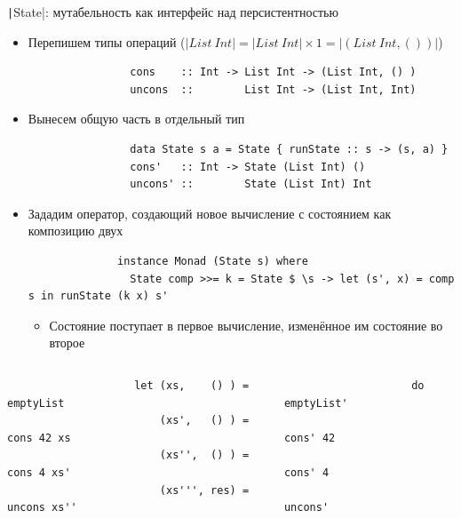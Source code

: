     \begin{frame}[fragile]{\texttt|State|: мутабельность как интерфейс над персистентностью}
        \pause
        \vspace{-0.5em}
        \begin{itemize}
            \item Перепишем типы операций ($|List~Int| = |List~Int| \times 1 = |(List~Int, ())|$)
            \begin{verbatim}
                cons    :: Int -> List Int -> (List Int, () )
                uncons  ::        List Int -> (List Int, Int)
            \end{verbatim}
            \item Вынесем общую часть в отдельный тип
            \begin{verbatim}
                data State s a = State { runState :: s -> (s, a) }
                cons'   :: Int -> State (List Int) ()
                uncons' ::        State (List Int) Int
            \end{verbatim}
            \item Зададим оператор, создающий новое вычисление с состоянием как композицию двух
            \begin{verbatim}
              instance Monad (State s) where
                State comp >>= k = State $ \s -> let (s', x) = comp s in runState (k x) s'
            \end{verbatim}
            \begin{itemize}
                \item Состояние поступает в первое вычисление, изменённое им состояние во второе
            \end{itemize}
        \end{itemize}
        \pause
        \vspace{-1.5em}
        \begin{columns}[onlytextwidth]
            \begin{column}[t]{0.485\textwidth}
                \begin{verbatim}
                    let (xs,    () ) = emptyList
                        (xs',   () ) = cons 42 xs
                        (xs'',  () ) = cons 4 xs'
                        (xs''', res) = uncons xs''
                \end{verbatim}
            \end{column}\hfill%
            \begin{column}[t]{0.485\textwidth}
                \begin{verbatim}
                    do emptyList'
                       cons' 42
                       cons' 4
                       uncons'
                \end{verbatim}
            \end{column}
        \end{columns}
    \end{frame}

